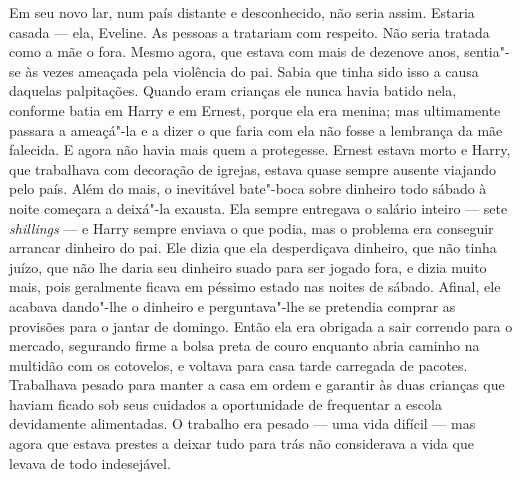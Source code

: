 Em seu novo lar, num país distante e desconhecido, não seria assim.  Estaria
casada --- ela, Eveline.  As pessoas a tratariam com respeito.  Não seria
tratada como a mãe o fora.  Mesmo agora, que estava com mais de dezenove anos,
sentia"-se às vezes ameaçada pela violência do pai.  Sabia que tinha sido isso a
causa daquelas palpitações.  Quando eram crianças ele nunca havia batido nela,
conforme batia em Harry e em Ernest, porque ela era menina; mas ultimamente
passara a ameaçá"-la e a dizer o que faria com ela não fosse a lembrança da mãe
falecida.  E agora não havia mais quem a protegesse.  Ernest estava morto e
Harry, que trabalhava com decoração de igrejas, estava quase sempre ausente
viajando pelo país.  Além do mais, o inevitável bate"-boca sobre dinheiro todo
sábado à noite começara a deixá"-la exausta.  Ela sempre entregava o salário
inteiro --- sete \textit{shillings} --- e Harry sempre enviava o que podia, mas
o problema era conseguir arrancar dinheiro do pai.  Ele dizia que ela
desperdiçava dinheiro, que não tinha juízo, que não lhe daria seu dinheiro
suado para ser jogado fora, e dizia muito mais, pois geralmente ficava em
péssimo estado nas noites de sábado.  Afinal, ele acabava dando"-lhe o dinheiro
e perguntava"-lhe se pretendia comprar as provisões para o jantar de domingo.
Então ela era obrigada a sair correndo para o mercado, segurando firme a bolsa
preta de couro enquanto abria caminho na multidão com os cotovelos, e voltava
para casa tarde carregada de pacotes.  Trabalhava pesado para manter a casa em
ordem e garantir às duas crianças que haviam ficado sob seus cuidados a
oportunidade de frequentar a escola devidamente alimentadas.  O trabalho era
pesado --- uma vida difícil --- mas agora que estava prestes a deixar tudo para
trás não considerava a vida que levava de todo indesejável.

